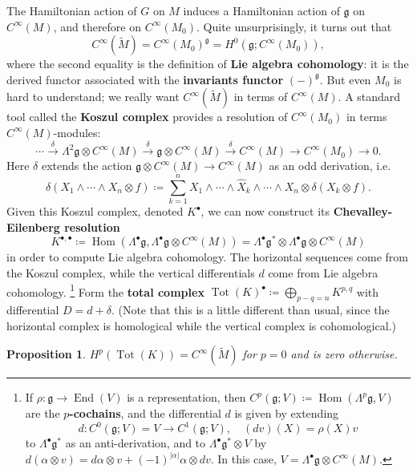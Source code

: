 \documentclass{report}
\theoremstyle{plain}
\newtheorem{proposition}[theorem]{Proposition}
\theoremstyle{definition}
\theoremstyle{remark}
\newcommand{\fg}{\mathfrak{g}}
\DeclareMathOperator{\End}{End}
\DeclareMathOperator{\Tot}{Tot}
\DeclareMathOperator{\Hom}{Hom}
\begin{document}
The Hamiltonian action of $G$ on $M$ induces a Hamiltonian action of
$\fg$ on $C^\infty(M)$, and therefore on $C^\infty(M_0)$. Quite unsurprisingly, it turns out that
\[ C^\infty(\tilde{M}) = C^\infty(M_0)^{\fg} = H^0(\fg; C^\infty(M_0)), \]
where the second equality is the definition of {\bf Lie algebra
  cohomology}: it is the derived functor associated with the {\bf
  invariants functor} $(-)^{\fg}$. But even $M_0$ is hard to
understand; we really want $C^\infty(\tilde{M})$ in terms of
$C^\infty(M)$. A standard tool called the {\bf Koszul complex}
provides a resolution of $C^\infty(M_0)$ in terms
$C^\infty(M)$-modules:
\[ \cdots \xrightarrow{\delta} \Lambda^2 \fg \otimes C^\infty(M) \xrightarrow{\delta} \fg \otimes C^\infty(M) \xrightarrow{\delta} C^\infty(M) \to C^\infty(M_0) \to 0. \]
Here $\delta$ extends the action $\fg \otimes C^\infty(M) \to
C^\infty(M)$ as an odd derivation, i.e.
\[ \delta(X_1 \wedge \cdots \wedge X_n \otimes f) \coloneqq \sum_{k=1}^n X_1 \wedge \cdots \wedge \hat{X}_k \wedge \cdots \wedge X_n \otimes \delta(X_k \otimes f). \]
Given this Koszul complex, denoted $K^\bullet$, we can now construct
its {\bf Chevalley-Eilenberg resolution}
\[ K^{\bullet,\bullet} \coloneqq \Hom(\Lambda^\bullet \fg, \Lambda^\bullet \fg \otimes C^\infty(M)) = \Lambda^\bullet \fg^* \otimes \Lambda^\bullet \fg \otimes C^\infty(M) \]
in order to compute Lie algebra cohomology. The horizontal sequences
come from the Koszul complex, while the vertical differentials $d$
come from Lie algebra cohomology. \footnote{If $\rho\colon \fg
  \to \End(V)$ is a representation, then $C^p(\fg; V) \coloneqq
  \Hom(\Lambda^p \fg, V)$ are the {\bf $p$-cochains}, and the
  differential $d$ is given by extending
  \[ d\colon C^0(\fg; V) = V \to C^1(\fg; V), \quad (dv)(X) = \rho(X)v \]
  to $\Lambda^\bullet \fg^*$ as an anti-derivation, and to
  $\Lambda^\bullet \fg^* \otimes V$ by $d(\alpha \otimes v) = d\alpha
  \otimes v + (-1)^{|\alpha|} \alpha \otimes dv$. In this case, $V =
  \Lambda^\bullet \fg \otimes C^\infty(M)$.} Form the {\bf total
  complex} $\Tot(K)^\bullet \coloneqq \bigoplus_{p-q=n} K^{p,q}$ with
differential $D = d + \delta$. (Note that this is a little different
than usual, since the horizontal complex is homological while the
vertical complex is cohomological.)

\begin{proposition}
  $H^p(\Tot(K)) = C^\infty(\tilde{M})$ for $p = 0$ and is zero
  otherwise.
\end{proposition}
\end{document}

